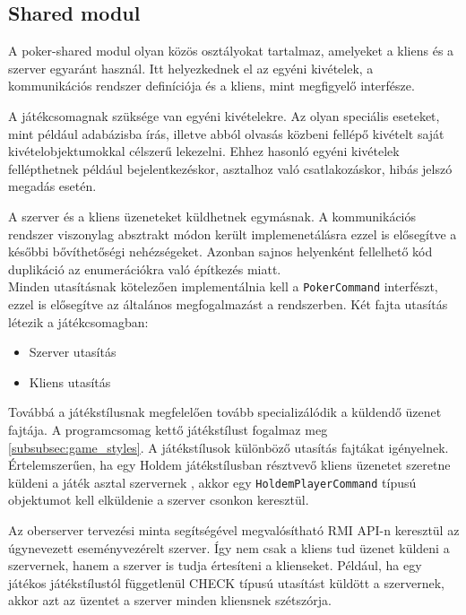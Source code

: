 \subsection{Shared modul}
A poker-shared modul olyan közös osztályokat tartalmaz, amelyeket a kliens és a szerver egyaránt használ. Itt helyezkednek el az egyéni kivételek, a kommunikációs rendszer definíciója és a kliens, mint megfigyelő interfésze.

A játékcsomagnak szüksége van egyéni kivételekre. Az olyan speciális eseteket, mint például adabázisba írás, illetve abból olvasás közbeni fellépő kivételt saját kivételobjektumokkal célszerű lekezelni. Ehhez hasonló egyéni kivételek fellépthetnek például bejelentkezéskor, asztalhoz való csatlakozáskor, hibás jelszó megadás esetén.

A szerver és a kliens üzeneteket küldhetnek egymásnak. A kommunikációs rendszer viszonylag absztrakt módon került implemenetálásra ezzel is elősegítve a későbbi bővíthetőségi nehézségeket. Azonban sajnos helyenként fellelhető kód duplikáció az enumerációkra való építkezés miatt. \\
Minden utasításnak kötelezően implementálnia kell a \texttt{PokerCommand} interfészt, ezzel is elősegítve az általános megfogalmazást a rendszerben. Két fajta utasítás létezik a játékcsomagban:
\begin{itemize}[leftmargin=2cm]
	\item Szerver utasítás
	\item Kliens utasítás
\end{itemize}
Továbbá a játékstílusnak megfelelően tovább specializálódik a küldendő üzenet fajtája. A programcsomag kettő játékstílust fogalmaz meg \ref{subsubsec:game_styles}. A játékstílusok különböző utasítás fajtákat igényelnek. Értelemszerűen, ha egy Holdem játékstílusban résztvevő kliens üzenetet szeretne küldeni a játék asztal szervernek , akkor egy \texttt{HoldemPlayerCommand} típusú objektumot kell elküldenie a szerver csonkon keresztül.

Az oberserver tervezési minta segítségével megvalósítható RMI API-n keresztül az úgynevezett eseményvezérelt szerver. Így nem csak a kliens tud üzenet küldeni a szervernek, hanem a szerver is tudja értesíteni a klienseket. Például, ha egy játékos játékstílustól függetlenül CHECK típusú utasítást küldött a szervernek, akkor azt az üzentet a szerver minden kliensnek szétszórja.

